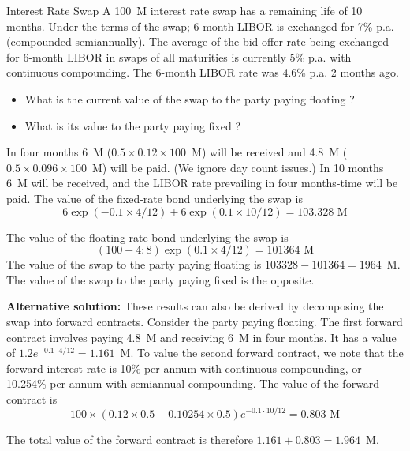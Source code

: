 \documentclass{beamer}
\begin{document}
\begin{frame}{}
\begin{block}{Interest Rate Swap}
A 100~M interest rate swap has a remaining life of 10 months. Under the terms of the swap; 6-month LIBOR is exchanged for 7\% p.a. (compounded semiannually). The average of the bid-offer rate being exchanged for 6-month LIBOR in swaps of all maturities is currently 5\% p.a. with continuous compounding. The 6-month LIBOR rate was 4.6\% p.a. 2 months ago. 
\begin{itemize}
\item What is the current value of the swap to the party paying floating ?
\item What is its value to the party paying fixed ?
\end{itemize}
\end{block}

In four months 6~M ($0.5\times 0.12\times 100$~M) will be received and 4.8~M ($0.5\times 0.096\times 100$~M) will be paid. (We ignore day count issues.) In 10 months 6~M will be received, and the LIBOR rate prevailing in four months-time will be paid. The value of the fixed-rate bond underlying the swap is
\begin{equation*}
6 \exp(-0.1 \times 4/12) + 6 \exp(0.1\times  10/12) = 103.328\text{~M}
\end{equation*}
\end{frame}

\begin{frame}{}
The value of the floating-rate bond underlying the swap is 
\begin{equation*}
(100 + 4:8) \exp(0.1\times  4/12) = 101364 \text{~M}
\end{equation*}
The value of the swap to the party paying floating is $103328-  101364 = 1964$~M. 
The value of the swap to the party paying fixed is the opposite. 

\textbf{Alternative solution:}
These results can also be derived by decomposing the swap into forward contracts. Consider the party paying floating. The first forward contract involves paying 4.8~M and receiving 6~M in four months. It has a value of $1.2e^{-0.1\cdot 4/12} = 1.161$~M.
To value the second forward contract, we note that the forward interest rate is 10\% per annum with continuous compounding, or 10.254\% per annum with semiannual compounding. The value of the forward contract is
\begin{equation*}
100\times  (0.12\times 0.5-0.10254\times 0.5)e^{-0.1\cdot 10/12} = 0.803 \text{~M}
\end{equation*}

The total value of the forward contract is therefore $1.161 + 0.803 = 1.964$~M.
\end{frame}
\end{document}
